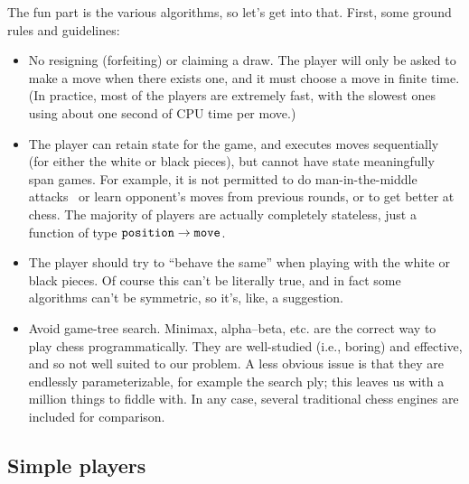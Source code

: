 \documentclass[10pt,preprint,twocolumn]{acmart}
\begin{document}
The fun part is the various algorithms, so let's get into that. First,
some ground rules and guidelines:
\begin{itemize}
\item No resigning (forfeiting) or claiming a draw. The player will
  only be asked to make a move when there exists one, and it must
  choose a move in finite time. (In practice, most of the players are
  extremely fast, with the slowest ones using about one second of
  CPU time per move.)
\item The player can retain state for the game, and executes moves
  sequentially (for either the white or black pieces), but cannot have
  state meaningfully span games. For example, it is not permitted to
  do man-in-the-middle attacks~\cite{blind} or learn opponent's moves
  from previous rounds, or to get better at chess. The majority of
  players are actually completely stateless, just a function of type
  ${\tt position} \rightarrow {\tt move}$.
\item The player should try to ``behave the same'' when playing with
  the white or black pieces. Of course this can't be literally true,
  and in fact some algorithms can't be symmetric, so it's, like, a
  suggestion.
\item Avoid game-tree search. Minimax, alpha--beta, etc. are the
  correct way to play chess programmatically. They are well-studied
  (i.e., boring) and effective, and so not well suited to our problem.
  A less obvious issue is that they are endlessly parameterizable, for
  example the search ply; this leaves us with a million things to
  fiddle with. In any case, several traditional chess engines are
  included for comparison.
\end{itemize}


\subsection{Simple players}
\end{document}
